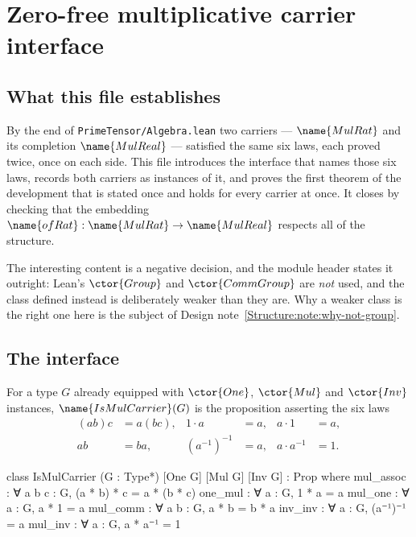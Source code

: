 
\section{Zero-free multiplicative carrier interface}
\label{Structure:sec}


\subsection*{What this file establishes}

By the end of \texttt{PrimeTensor/Algebra.lean} two carriers ---
$\name{MulRat}$ and its completion $\name{MulReal}$ --- satisfied the same six
laws, each proved twice, once on each side.  This file introduces the interface
that names those six laws, records both carriers as instances of it, and proves
the first theorem of the development that is stated once and holds for every
carrier at once.  It closes by checking that the embedding
$\name{ofRat} : \name{MulRat} \to \name{MulReal}$ respects all of the
structure.

The interesting content is a negative decision, and the module header states it
outright: Lean's $\ctor{Group}$ and $\ctor{CommGroup}$ are \emph{not} used, and
the class defined instead is deliberately weaker than they are.  Why a weaker
class is the right one here is the subject of
Design note~\ref{Structure:note:why-not-group}.

\subsection{The interface}

\begin{definition}\label{Structure:def:ismulcarrier}
For a type $G$ already equipped with $\ctor{One}$, $\ctor{Mul}$ and
$\ctor{Inv}$ instances, $\name{IsMulCarrier}(G)$ is the proposition asserting
the six laws
\begin{align*}
  (ab)c &= a(bc), &
  1 \cdot a &= a, &
  a \cdot 1 &= a, \\
  ab &= ba, &
  (a^{-1})^{-1} &= a, &
  a \cdot a^{-1} &= 1 .
\end{align*}
\end{definition}

\begin{leancode}
class IsMulCarrier (G : Type*) [One G] [Mul G] [Inv G] : Prop where
  mul_assoc : ∀ a b c : G, (a * b) * c = a * (b * c)
  one_mul : ∀ a : G, 1 * a = a
  mul_one : ∀ a : G, a * 1 = a
  mul_comm : ∀ a b : G, a * b = b * a
  inv_inv : ∀ a : G, (a⁻¹)⁻¹ = a
  mul_inv : ∀ a : G, a * a⁻¹ = 1
\end{leancode}

